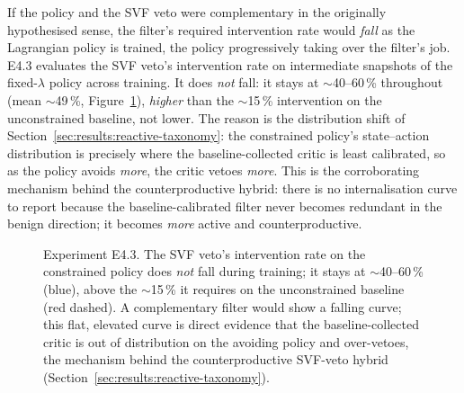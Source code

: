 \documentclass[11pt,a4paper]{report}
\begin{document}
If the policy and the SVF veto were complementary in the originally
hypothesised sense, the filter's required intervention rate would
\emph{fall} as the Lagrangian policy is trained, the policy
progressively taking over the filter's job. E4.3 evaluates the SVF
veto's intervention rate on intermediate snapshots of the
fixed-$\lambda$ policy across training. It does \emph{not} fall: it
stays at $\sim$40--60\,\% throughout (mean $\sim$49\,\%, Figure~\ref{fig:e4.3-internalisation}),
\emph{higher} than the $\sim$15\,\% intervention on the unconstrained
baseline, not lower. The reason is the distribution shift of
Section~\ref{sec:results:reactive-taxonomy}: the constrained policy's
state--action distribution is precisely where the baseline-collected
critic is least calibrated, so as the policy avoids \emph{more}, the
critic vetoes \emph{more}. This is the corroborating mechanism behind
the counterproductive hybrid: there is no internalisation curve to
report because the baseline-calibrated filter never becomes redundant
in the benign direction; it becomes \emph{more} active and
counterproductive.

\begin{figure}[h]
\centering
{}
\caption{Experiment E4.3. The SVF veto's intervention rate on the
constrained policy does \emph{not} fall during training; it stays at
$\sim$40--60\,\% (blue), above the $\sim$15\,\% it requires on the
unconstrained baseline (red dashed). A complementary filter would show
a falling curve; this flat, elevated curve is direct evidence that the
baseline-collected critic is out of distribution on the avoiding
policy and over-vetoes, the mechanism behind the counterproductive
SVF-veto hybrid (Section~\ref{sec:results:reactive-taxonomy}).}
\label{fig:e4.3-internalisation}
\end{figure}
\end{document}
